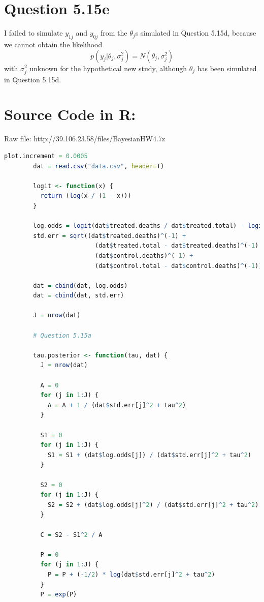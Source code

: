 \documentclass{article}
\begin{document}
\section*{Question 5.15e}
{
    I failed to simulate $y_{1j}$ and $y_{0j}$ from the $\theta_j$s simulated in Question 5.15d, because we cannot obtain the likelihood $$p(y_j | \theta_j, \sigma_j^2) = N(\theta_j, \sigma_j^2)$$ with $\sigma_j^2$ unknown for the hypothetical new study, although $\theta_j$ has been simulated in Question 5.15d.
}

\section*{Source Code in R:}
{
    Raw file: http://39.106.23.58/files/BayesianHW4.7z

    \begin{lstlisting}[language=R]
        plot.increment = 0.0005
        dat = read.csv("data.csv", header=T)
        
        logit <- function(x) {
          return (log(x / (1 - x)))
        }
        
        log.odds = logit(dat$treated.deaths / dat$treated.total) - logit(dat$control.deaths / dat$control.total)
        std.err = sqrt((dat$treated.deaths)^(-1) + 
                         (dat$treated.total - dat$treated.deaths)^(-1) + 
                         (dat$control.deaths)^(-1) +
                         (dat$control.total - dat$control.deaths)^(-1))
        
        dat = cbind(dat, log.odds)
        dat = cbind(dat, std.err)
        
        J = nrow(dat)
        
        # Question 5.15a
        
        tau.posterior <- function(tau, dat) {
          J = nrow(dat)
          
          A = 0
          for (j in 1:J) {
            A = A + 1 / (dat$std.err[j]^2 + tau^2)
          }
          
          S1 = 0
          for (j in 1:J) {
            S1 = S1 + (dat$log.odds[j]) / (dat$std.err[j]^2 + tau^2)
          }
          
          S2 = 0
          for (j in 1:J) {
            S2 = S2 + (dat$log.odds[j]^2) / (dat$std.err[j]^2 + tau^2)
          }
          
          C = S2 - S1^2 / A
          
          P = 0
          for (j in 1:J) {
            P = P + (-1/2) * log(dat$std.err[j]^2 + tau^2)
          }
          P = exp(P)
          

\end{lstlisting}}
\end{document}
